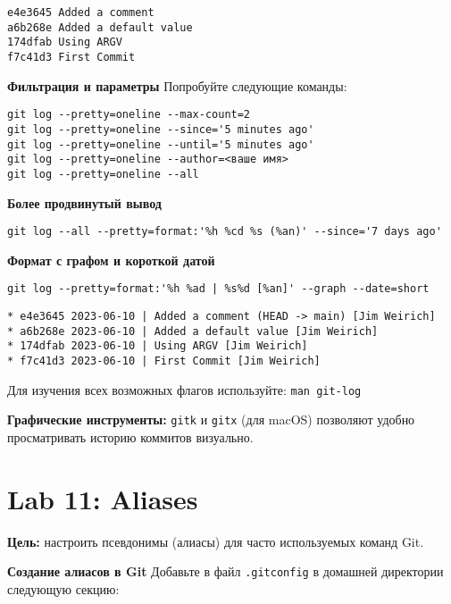 \documentclass[a4paper,12pt]{report}
\begin{document}
\begin{verbatim}
e4e3645 Added a comment
a6b268e Added a default value
174dfab Using ARGV
f7c41d3 First Commit
\end{verbatim}


\textbf{Фильтрация и параметры}
Попробуйте следующие команды:
\begin{verbatim}
git log --pretty=oneline --max-count=2
git log --pretty=oneline --since='5 minutes ago'
git log --pretty=oneline --until='5 minutes ago'
git log --pretty=oneline --author=<ваше имя>
git log --pretty=oneline --all
\end{verbatim}

\textbf{Более продвинутый вывод}
\begin{verbatim}
git log --all --pretty=format:'%h %cd %s (%an)' --since='7 days ago'
\end{verbatim}

\textbf{Формат с графом и короткой датой}
\begin{verbatim}
git log --pretty=format:'%h %ad | %s%d [%an]' --graph --date=short
\end{verbatim}

\begin{verbatim}
* e4e3645 2023-06-10 | Added a comment (HEAD -> main) [Jim Weirich]
* a6b268e 2023-06-10 | Added a default value [Jim Weirich]
* 174dfab 2023-06-10 | Using ARGV [Jim Weirich]
* f7c41d3 2023-06-10 | First Commit [Jim Weirich]
\end{verbatim}


Для изучения всех возможных флагов используйте: \texttt{man git-log}

\textbf{Графические инструменты:} \texttt{gitk} и \texttt{gitx} (для macOS) позволяют удобно просматривать историю коммитов визуально.

\section{Lab 11: Aliases}
\textbf{Цель:} настроить псевдонимы (алиасы) для часто используемых команд Git.

\textbf{Создание алиасов в Git}
Добавьте в файл \texttt{.gitconfig} в домашней директории следующую секцию:
\end{document}
